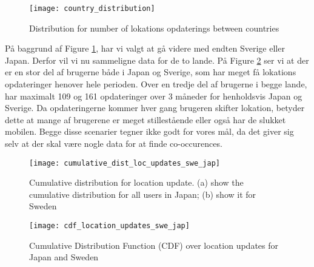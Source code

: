 

\begin{figure}[H]
    \centering
    \texttt{[image: country\_distribution]}
    \caption{Distribution for number of lokations opdaterings between countries}
    \label{fig:country_dist}
\end{figure}

På baggrund af Figure \ref{fig:country_dist}, har vi valgt at gå videre med endten Sverige eller Japan. Derfor vil vi nu sammeligne data for de to lande. 
På Figure \ref{fig:country_cd} ser vi at der er en stor del af brugerne både i Japan og Sverige, som har meget få lokations opdateringer henover hele perioden. Over en tredje del af brugerne i begge lande, har maximalt 109 og 161 opdateringer over 3 måneder for henholdsvis Japan og Sverige. Da opdateringerne kommer hver gang brugeren skifter lokation, betyder dette at mange af brugerene er meget stillestående eller også har de slukket mobilen. Begge disse scenarier tegner ikke godt for vores mål, da det giver sig selv at der skal være nogle data for at finde co-occurences. 


\begin{figure}[H]
    \centering
    \texttt{[image: cumulative\_dist\_loc\_updates\_swe\_jap]}
    \caption[Cumulative distribution for location update]{Cumulative distribution for location update. (a) show the cumulative distribution for all users in Japan; (b) show it for Sweden}
    \label{fig:country_cd}
\end{figure}



\begin{figure}[H]
    \centering
    \texttt{[image: cdf\_location\_updates\_swe\_jap]}
    \caption{Cumulative Distribution Function (CDF) over location updates for Japan and Sweden}
    \label{fig:country_cdf}
\end{figure}

